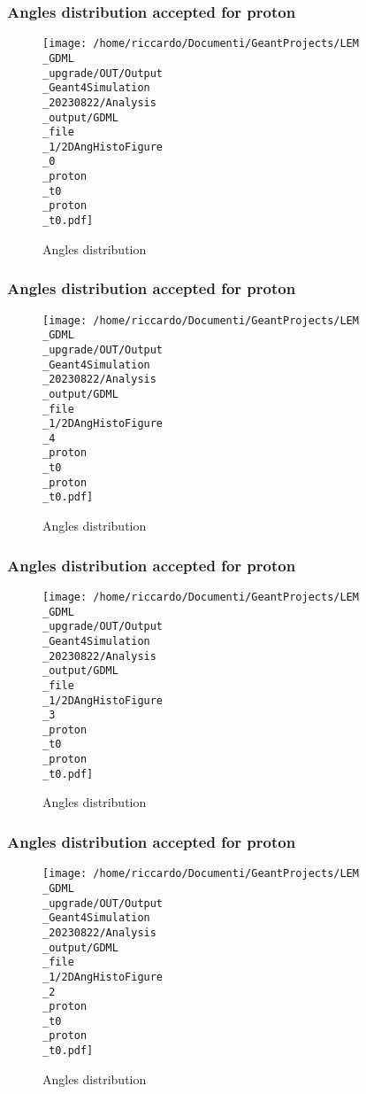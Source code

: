 \documentclass[8pt]{beamer}
\begin{document}
            \begin{frame}
                \frametitle{Angles distribution accepted for proton}
            
        \begin{figure}[h]
            \centering
            \texttt{[image: /home/riccardo/Documenti/GeantProjects/LEM\\\_GDML\\\_upgrade/OUT/Output\\\_Geant4Simulation\\\_20230822/Analysis\\\_output/GDML\\\_file\\\_1/2DAngHistoFigure\\\_0\\\_proton\\\_t0\\\_proton\\\_t0.pdf]}
            \caption{Angles distribution}
        \end{figure}
        
            \end{frame}
            
            \begin{frame}
                \frametitle{Angles distribution accepted for proton}
            
        \begin{figure}[h]
            \centering
            \texttt{[image: /home/riccardo/Documenti/GeantProjects/LEM\\\_GDML\\\_upgrade/OUT/Output\\\_Geant4Simulation\\\_20230822/Analysis\\\_output/GDML\\\_file\\\_1/2DAngHistoFigure\\\_4\\\_proton\\\_t0\\\_proton\\\_t0.pdf]}
            \caption{Angles distribution}
        \end{figure}
        
            \end{frame}
            
            \begin{frame}
                \frametitle{Angles distribution accepted for proton}
            
        \begin{figure}[h]
            \centering
            \texttt{[image: /home/riccardo/Documenti/GeantProjects/LEM\\\_GDML\\\_upgrade/OUT/Output\\\_Geant4Simulation\\\_20230822/Analysis\\\_output/GDML\\\_file\\\_1/2DAngHistoFigure\\\_3\\\_proton\\\_t0\\\_proton\\\_t0.pdf]}
            \caption{Angles distribution}
        \end{figure}
        
            \end{frame}
            
            \begin{frame}
                \frametitle{Angles distribution accepted for proton}
            
        \begin{figure}[h]
            \centering
            \texttt{[image: /home/riccardo/Documenti/GeantProjects/LEM\\\_GDML\\\_upgrade/OUT/Output\\\_Geant4Simulation\\\_20230822/Analysis\\\_output/GDML\\\_file\\\_1/2DAngHistoFigure\\\_2\\\_proton\\\_t0\\\_proton\\\_t0.pdf]}
            \caption{Angles distribution}
        \end{figure}
        
            \end{frame}
            
\end{document}
